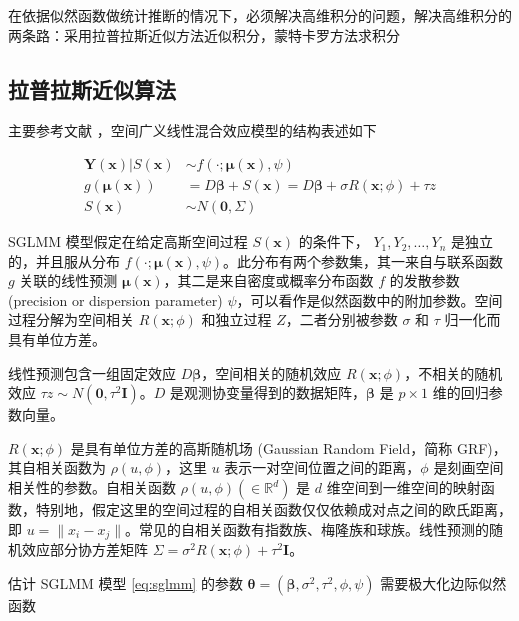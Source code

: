 \documentclass[12pt,a4paper,UTF8,twoside]{book}
\theoremstyle{definition}
\theoremstyle{definition}
\theoremstyle{definition}
\theoremstyle{remark}
\begin{document}
在依据似然函数做统计推断的情况下，必须解决高维积分的问题，解决高维积分的两条路：采用拉普拉斯近似方法近似积分，蒙特卡罗方法求积分

\hypertarget{LA}{%
\subsection{拉普拉斯近似算法}\label{LA}}

主要参考文献
\citep{Bonat2016Practical}，空间广义线性混合效应模型的结构表述如下

\begin{equation}
\begin{aligned}
\mathbf{Y(x)} | S(\mathbf{x}) & \sim  f(\cdot;\boldsymbol{\mu(x)},\psi) \\
g(\boldsymbol{\mu(x)}) & =  D\boldsymbol{\beta} + S(\mathbf{x}) 
                         = D\boldsymbol{\beta} + \sigma R(\mathbf{x};\phi) + \tau z \\
S(\mathbf{x}) & \sim  N(\mathbf{0},\Sigma)
\end{aligned} \label{eq:sglmm}
\end{equation}

SGLMM 模型假定在给定高斯空间过程 \(S(\mathbf{x})\) 的条件下，
\(Y_1,Y_2,\ldots,Y_n\) 是独立的，并且服从分布
\(f(\cdot;\boldsymbol{\mu(x)},\psi)\)。此分布有两个参数集，其一来自与联系函数
\(g\) 关联的线性预测
\(\boldsymbol{\mu(x)}\)，其二是来自密度或概率分布函数 \(f\) 的发散参数
(precision or dispersion parameter)
\(\psi\)，可以看作是似然函数中的附加参数。空间过程分解为空间相关
\(R(\mathbf{x};\phi)\) 和独立过程 \(Z\)，二者分别被参数 \(\sigma\) 和
\(\tau\) 归一化而具有单位方差。

线性预测包含一组固定效应 \(D\boldsymbol{\beta}\)，空间相关的随机效应
\(R(\mathbf{x};\phi)\)，不相关的随机效应
\(\tau z \sim N(\mathbf{0},\tau^2\mathbf{I})\)。\(D\)
是观测协变量得到的数据矩阵，\(\boldsymbol{\beta}\) 是 \(p \times 1\)
维的回归参数向量。

\(R(\mathbf{x};\phi)\) 是具有单位方差的高斯随机场 (Gaussian Random
Field，简称 GRF)，其自相关函数为 \(\rho(u,\phi)\)，这里 \(u\)
表示一对空间位置之间的距离，\(\phi\) 是刻画空间相关性的参数。自相关函数
\(\rho(u,\phi) (\in \mathbb{R}^d)\) 是 \(d\)
维空间到一维空间的映射函数，特别地，假定这里的空间过程的自相关函数仅仅依赖成对点之间的欧氏距离，即
\(u =\|x_i - x_j\|\)。常见的自相关函数有指数族、梅隆族和球族。线性预测的随机效应部分协方差矩阵
\(\Sigma = \sigma^2 R(\mathbf{x};\phi) + \tau^2\mathbf{I}\)。

估计 SGLMM 模型 \eqref{eq:sglmm} 的参数
\(\boldsymbol{\theta} = (\boldsymbol{\beta},\sigma^2,\tau^2,\phi,\psi)\)
需要极大化边际似然函数
\end{document}
